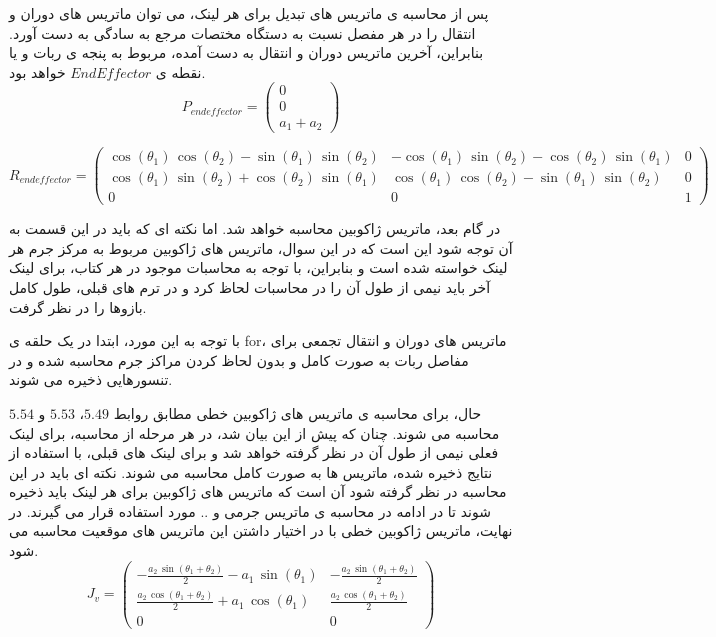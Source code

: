 پس از محاسبه ی ماتریس های تبدیل برای هر لینک، می توان ماتریس های دوران و انتقال را در هر مفصل نسبت به دستگاه مختصات مرجع به سادگی به دست آورد. بنابراین، آخرین ماتریس دوران و انتقال به دست آمده، مربوط به پنجه ی ربات و یا نقطه ی $End Effector$ خواهد بود.
\[
P_{\text{$end effector$}} = 
\left(\begin{array}{c} 
	0\\
	0\\
	a_1 + a_2 
\end{array}\right)
\]

\[
R_{\text{$end effector$}} = 
\left(\begin{array}{ccc}
	\cos \left(\theta_1 \right)\,\cos \left(\theta_2 \right)-\sin \left(\theta_1 \right)\,\sin \left(\theta_2 \right) & -\cos \left(\theta_1 \right)\,\sin \left(\theta_2 \right)-\cos \left(\theta_2 \right)\,\sin \left(\theta_1 \right) & 0\\
	\cos \left(\theta_1 \right)\,\sin \left(\theta_2 \right)+\cos \left(\theta_2 \right)\,\sin \left(\theta_1 \right) & \cos \left(\theta_1 \right)\,\cos \left(\theta_2 \right)-\sin \left(\theta_1 \right)\,\sin \left(\theta_2 \right) & 0\\
	0 & 0 & 1
\end{array}\right)
\]

در گام بعد، ماتریس ژاکوبین محاسبه خواهد شد. اما نکته ای که باید در این قسمت به آن توجه شود این است که در این سوال، ماتریس های ژاکوبین مربوط به مرکز جرم هر لینک خواسته شده است و بنابراین، با توجه به محاسبات موجود در هر کتاب، برای لینک آخر باید نیمی از طول آن را در محاسبات لحاظ کرد و در ترم های قبلی، طول کامل بازوها را در نظر گرفت.

با توجه به این مورد، ابتدا در یک حلقه ی for، ماتریس های دوران و انتقال تجمعی برای مفاصل ربات به صورت کامل و بدون لحاظ کردن مراکز جرم محاسبه شده و در تنسورهایی ذخیره می شوند.

حال، برای محاسبه ی ماتریس های ژاکوبین خطی مطابق روابط $5.49$، $5.53$ و $5.54$ محاسبه می شوند. چنان که پیش از این بیان شد، در هر مرحله از محاسبه، برای لینک فعلی نیمی از طول آن در نظر گرفته خواهد شد و برای لینک های قبلی، با استفاده از نتایج ذخیره شده، ماتریس ها به صورت کامل محاسبه می شوند. 
نکته ای باید در این محاسبه در نظر گرفته شود آن است که ماتریس های ژاکوبین برای هر لینک باید ذخیره شوند تا در ادامه در محاسبه ی ماتریس جرمی و .. مورد استفاده قرار می گیرند.
در نهایت، ماتریس ژاکوبین خطی با در اختیار داشتن این ماتریس های موقعیت محاسبه می شود.
\[
J_v = 
\left(\begin{array}{cc}
	-\frac{a_2 \,\sin \left(\theta_1 +\theta_2 \right)}{2} - a_1 \,\sin \left(\theta_1 \right) & -\frac{a_2 \,\sin \left(\theta_1 +\theta_2 \right)}{2} \\
	\frac{a_2 \,\cos \left(\theta_1 +\theta_2 \right)}{2} + a_1 \,\cos \left(\theta_1 \right) & \frac{a_2 \,\cos \left(\theta_1 +\theta_2 \right)}{2} \\
	0 & 0
\end{array}\right)
\]

